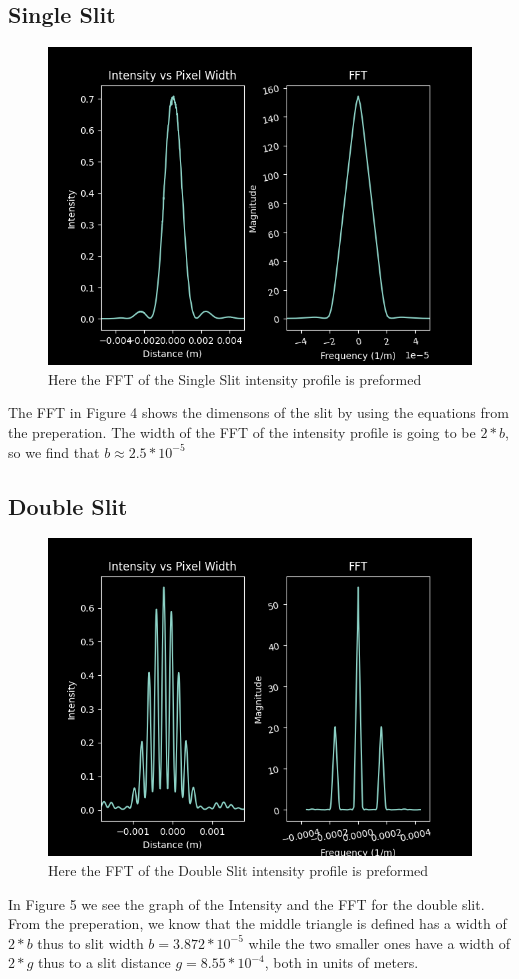 \documentclass{article}
\begin{document}
\subsection{Single Slit}
\begin{figure}[h]
  \caption{Here the FFT of the Single Slit intensity profile is preformed}
  \centering
  \includegraphics[scale=0.6]{ES1_2graph.png}

\end{figure}
The FFT in Figure 4 shows the dimensons of the slit by using the equations from the preperation. The width of the FFT of the intensity profile is going to be $2*b$, so we find that $b\approx 2.5*10^{-5}$
\subsection{Double Slit}
\begin{figure}[h]
  \caption{Here the FFT of the Double Slit intensity profile is preformed}
  \centering
  \includegraphics[scale=0.6]{DS4_1graph.png}

\end{figure}
In Figure 5 we see the graph of the Intensity and the FFT for the double slit.
From the preperation, we know that the middle triangle is defined has a width of $2*b$ thus to slit width $b=3.872*10^{-5}$ while the two smaller ones have a width of $2*g$ thus to a slit distance $g=8.55*10^{-4}$, both in units of meters.
\end{document}
